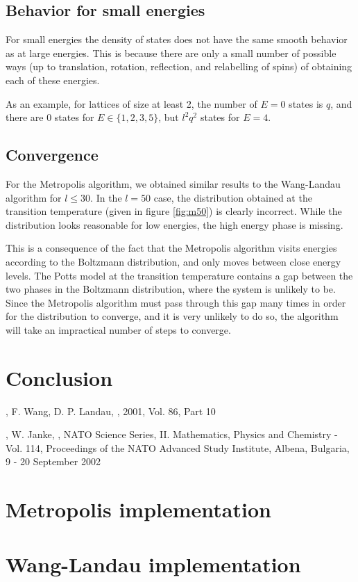 \documentclass{article}
\begin{document}
\subsection{Behavior for small energies}
For small energies the density of states does not have the same smooth behavior as at large energies.
This is because there are only a small number of possible ways (up to translation, rotation, reflection, and relabelling of spins) of obtaining each of these energies.

As an example, for lattices of size at least 2, the number of $E = 0$ states is $q$, and there are $0$ states for $E \in \{1,2,3,5\}$, but $l^2q^2$ states for $E = 4$.

\subsection{Convergence}
For the Metropolis algorithm, we obtained similar results to the Wang-Landau algorithm for $l \leq 30$.
In the $l = 50$ case, the distribution obtained at the transition temperature (given in figure \ref{fig:m50}) is clearly incorrect.
While the distribution looks reasonable for low energies, the high energy phase is missing.

This is a consequence of the fact that the Metropolis algorithm visits energies according to the Boltzmann distribution, and only moves between close energy levels.
The Potts model at the transition temperature contains a gap between the two phases in the Boltzmann distribution, where the system is unlikely to be.
Since the Metropolis algorithm must pass through this gap many times in order for the distribution to converge, and it is very unlikely to do so, the algorithm will take an impractical number of steps to converge.

\section{Conclusion}
\begin{thebibliography}{9}

,
\newblock F. Wang, D. P. Landau,
, 2001, Vol. 86, Part 10

,
\newblock W. Janke,
, NATO Science Series, II. Mathematics, Physics and Chemistry - Vol. 114, Proceedings of the NATO Advanced Study Institute, Albena, Bulgaria, 9 - 20 September 2002

\end{thebibliography}
\appendix
\section{Metropolis implementation}

\section{Wang-Landau implementation}

\end{document}

